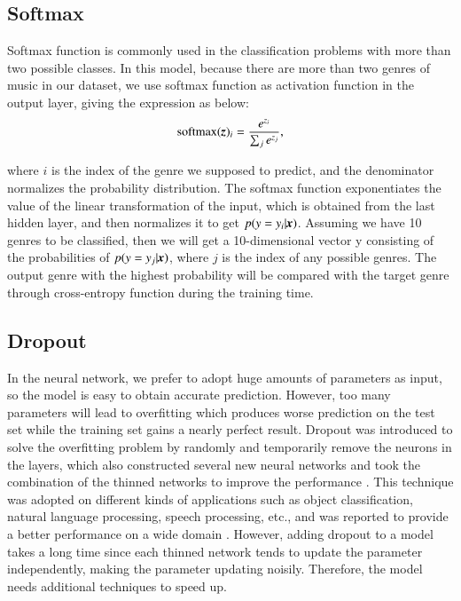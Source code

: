 \documentclass{article}
\def\mathbi#1{\textbf{\em #1}}
\begin{document}
\subsection{Softmax}
Softmax function is commonly used in the classification problems with more than two possible classes. In this model, because there are more than two genres of music in our dataset, we use softmax function as activation function in the output layer, giving the expression as below:
\begin{equation}
	\mathrm{softmax}(\mathbi{z})_i=\frac{e^{z_i}}{\sum_j e^{z_j}},
\end{equation}

where $i$ is the index of the genre we supposed to predict, and the denominator normalizes the probability distribution. The softmax function exponentiates the value of the linear transformation of the input, which is obtained from the last hidden layer, and then normalizes it to get ${p(y=y_i|\mathbi{x})}$. Assuming we have 10 genres to be classified, then we will get a 10-dimensional vector y consisting of the probabilities of $p(y=y_j|\mathbi{x})$, where $j$ is the index of any possible genres. The output genre with the highest probability will be compared with the target genre through cross-entropy function during the training time.

\subsection{Dropout}
In the neural network, we prefer to adopt huge amounts of parameters as input, so the model is easy to obtain accurate prediction. However, too many parameters will lead to overfitting which produces worse prediction on the test set while the training set gains a nearly perfect result. Dropout was introduced to solve the overfitting problem by randomly and temporarily remove the neurons in the layers, which also constructed several new neural networks and took the combination of the thinned networks to improve the performance \cite{ srivastava2014dropout}. This technique was adopted on different kinds of applications such as object classification, natural language processing, speech processing, etc., and was reported to provide a better performance on a wide domain \cite{srivastava2014dropout}. However, adding dropout to a model takes a long time since each thinned network tends to update the parameter independently, making the parameter updating noisily. Therefore, the model needs additional techniques to speed up.
\end{document}
